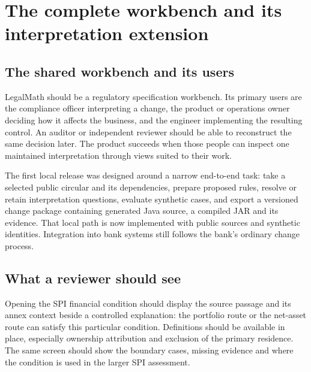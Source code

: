 \chapter{The complete workbench and its interpretation extension}
\label{ch:implementation}

\section{The shared workbench and its users}
\label{merge:P-03-product:00}

\label{sec:product}

LegalMath should be a regulatory specification workbench. Its primary users are
the compliance officer interpreting a change, the product or operations owner
deciding how it affects the business, and the engineer implementing the resulting
control. An auditor or independent reviewer should be able to reconstruct the
same decision later. The product succeeds when those people can inspect one
maintained interpretation through views suited to their work.

The first local release was designed around a narrow end-to-end task: take a selected public
circular and its dependencies, prepare proposed rules, resolve or retain
interpretation questions, evaluate synthetic cases, and export a versioned change
package containing generated Java source, a compiled JAR and its evidence.
That local path is now implemented with public sources and synthetic
identities. Integration into bank systems still follows the bank's ordinary
change process.


\section{What a reviewer should see}
\label{merge:P-03-product:01}


Opening the SPI financial condition should display the source passage and its
annex context beside a controlled explanation: the portfolio route or the
net-asset route can satisfy this particular condition. Definitions should be
available in place, especially ownership attribution and exclusion of the primary
residence. The same screen should show the boundary cases, missing evidence and
where the condition is used in the larger SPI assessment.

